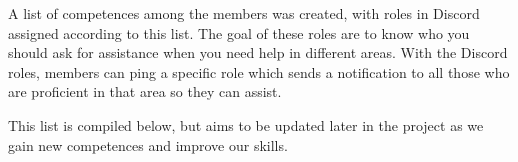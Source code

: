 A list of competences among the members was created, with roles in Discord assigned according to this list. The goal of these roles are to know who you should ask for assistance when you need help in different areas. With the Discord roles, members can ping a specific role which sends a notification to all those who are proficient in that area so they can assist.

This list is compiled below, but aims to be updated later in the project as we gain new competences and improve our skills.


